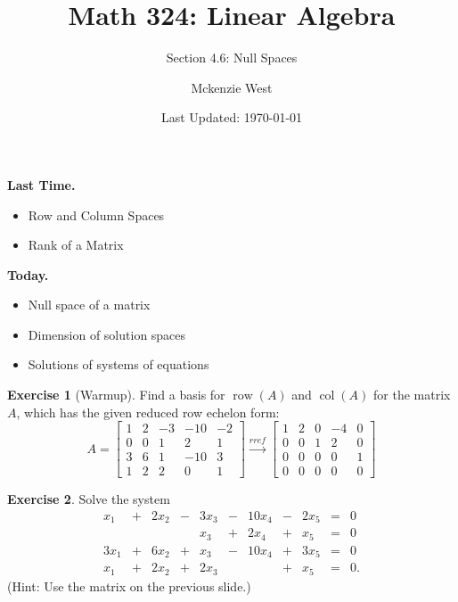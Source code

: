 \documentclass{beamer}
\newcommand{\fn}{\insertframenumber}
\newcommand{\col}{\operatorname{col}}
\newcommand{\row}{\operatorname{row}}
\theoremstyle{definition}
\newtheorem{exercise}{Exercise}
\begin{document}
	\title{Math 324: Linear Algebra}
	\subtitle{Section 4.6: Null Spaces}
	\author{Mckenzie West}
	\date{Last Updated: \today}
\begin{frame}
\maketitle
\end{frame}

\begin{frame}{\insertframenumber}
	\begin{block}{\textbf{Last Time.}}
	\begin{itemize}[label=--]
		\item Row and Column Spaces
		\item Rank of a Matrix
	\end{itemize}
	\end{block}
	\begin{block}{\textbf{Today.}}
		\begin{itemize}[label=--]
			\item Null space of a matrix
			\item Dimension of solution spaces
			\item Solutions of systems of equations
		\end{itemize}
	\end{block}
\end{frame}
\begin{frame}{\fn}
	\begin{exercise}[Warmup]\label{first}
		Find a basis for $\row(A)$ and $\col(A)$ for the matrix $A$, which has the given reduced row echelon form:
			\[A=\left[\begin{array}{rrrrr}
			1 & 2 & -3 & -10 & -2 \\
			0 & 0 & 1 & 2 & 1 \\
			3 & 6 & 1 & -10 & 3 \\
			1 & 2 & 2 & 0 & 1
			\end{array}\right]\xrightarrow{rref}
			\left[\begin{array}{rrrrr}
			1 & 2 & 0 & -4 & 0 \\
			0 & 0 & 1 & 2 & 0 \\
			0 & 0 & 0 & 0 & 1 \\
			0 & 0 & 0 & 0 & 0
			\end{array}\right]\]
	\end{exercise}
\end{frame}
\begin{frame}{\fn}
	\begin{exercise}\label{second}
		Solve the system
			\[\begin{array}{rcrcrcrcrcl}
			x_1 &+& 2x_2 &-& 3x_3 & -&10x_4 & -&2x_5&=&0 \\
			 &&&& x_3&+ & 2x_4&+ & x_5&=&0 \\
			3x_1&+ & 6x_2&+ & x_3 & -&10x_4&+ & 3x_5&=&0 \\
			x_1&+ & 2x_2&+ & 2x_3 &  &&+& x_5&=&0.
			\end{array}\]
		(Hint: Use the matrix on the previous slide.)
	\end{exercise}
\end{frame}
\end{document}
